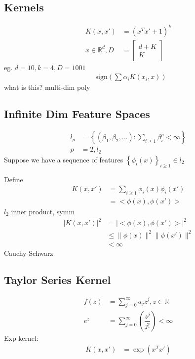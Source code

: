 \documentclass{article}
\begin{document}
\subsection{Kernels}
\begin{align*}
K\left(x, x'\right)  &= \left(x^{T} x' + 1\right)^{k}
\\ x  \in \mathbb{R}^{d}, D  &= \begin{bmatrix} d+K \\ K \end{bmatrix}
\end{align*}
eg. $d  = 10, k  = 4, D  = 1001$
\begin{align*}
&\text{sign}\left(\displaystyle\sum \alpha_{i} K\left(x_{i}, x \right)\right)
\end{align*}
what is this? multi-dim poly



\subsection{Infinite Dim Feature Spaces}
\begin{align*}
l_{p} &= \left\{\left(\beta_{1}, \beta_{2}, ...\right) : \displaystyle\sum_{i \geq  1} \beta_{i}^{p} < \infty\right\}
\\ p  &= 2, l_{2}
\end{align*}
Suppose we have a sequence of features $\left\{\phi_{i}\left(x\right)\right\}_{i \geq  1} \in l_{2}$

Define
\begin{align*}
K\left(x, x'\right)  &= \displaystyle\sum_{i \geq  1} \phi_{i}\left(x\right) \phi_{i}\left(x'\right)
\\ &= < \phi\left(x\right), \phi\left(x'\right) >
\end{align*}
$l_{2}$ inner product, symm
\begin{align*}
| K\left(x, x'\right)  |^{2} &= | < \phi\left(x\right), \phi\left(x'\right) > |^{2}
\\ &\leq  \| \phi\left(x\right) \|^{2} \| \phi\left(x'\right) \|^{2}
\\ &< \infty
\end{align*}
Cauchy-Schwarz



\subsection{Taylor Series Kernel}
\begin{align*}
f\left(z\right)  &= \displaystyle\sum_{j=0}^{\infty} a_{j} z^{j}, z \in \mathbb{R}
\\ e^{z} &= \displaystyle\sum_{j=0}^{\infty} \left(\dfrac{z^{j}}{j!}\right) < \infty
\end{align*}
Exp kernel:
\begin{align*}
K\left(x, x'\right)  &= \exp\left(x^{T} x'\right)
\end{align*}
\end{document}

